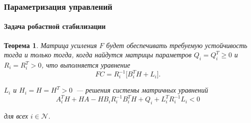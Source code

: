 \documentclass[ignorenonframetext,hyperref={pdftex,unicode},compress,handout]{beamer}
\newcommand{\br}{\vspace{12pt}}
\newtheorem{teo}{Теорема}
\begin{document}
\begin{frame}
    \frametitle{Параметризация управлений}
    \framesubtitle{Задача робастной стабилизации}
    \begin{teo}
        \par Матрица усиления $F$ будет обеспечивать требуемую устойчивость тогда и только тогда, когда найдутся матрицы параметров $Q_i = Q_i^T \geqslant 0$ и $R_i = R_i^T > 0$, что выполняется уравнение
        \begin{equation}
            FC = R_i^{-1}\big[ B_i^TH + L_i \big]\mbox{.}
        \end{equation}
        \br
        \par $L_i$ и $H_i = H = H^T > 0$~--- решения системы матричных уравнений
        \begin{equation}
            A_i^TH + HA - HB_iR_i^{-1}B_i^TH + Q_i + L_i^TR_i^{-1}L_i < 0
        \end{equation}
        \par для всех $i \in \mathcal{N}$.
    \end{teo}
\end{frame}
\end{document}

